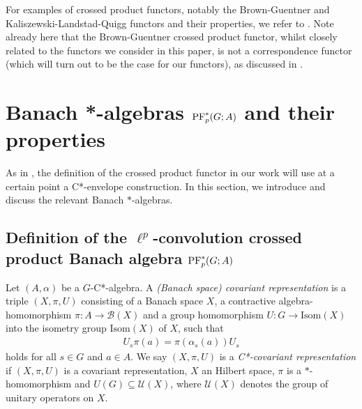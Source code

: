 \documentclass[12pt]{amsart}
\theoremstyle{definition}
\theoremstyle{remark}
\numberwithin{equation}{section}
\begin{document}
For examples of crossed product functors, notably the Brown-Guentner and Kaliszewski-Landstad-Quigg functors and their properties, we refer to \cite{BEW}. Note already here that the Brown-Guentner crossed product functor, whilst closely related to the functors we consider in this paper, is not a correspondence functor (which will turn out to be the case for our functors), as discussed in \cite[Remark 4.19]{BEW}.


\section{Banach *-algebras $\textup{PF}_p^*(G;A)$ and their properties} \label{sec:Banach}

As in \cite{SW2}, the  definition of the crossed product functor in our work will use at a certain point a C*-envelope construction. In this section, we introduce and discuss the relevant Banach $*$-algebras.

\subsection{Definition of the $\ell^p$-convolution crossed product Banach algebra $\textup{PF}_p^*(G;A)$}


Let $(A,\alpha)$ be a $G$-C*-algebra. A \emph{(Banach space) covariant representation} is a triple
$(X,\pi, U)$ consisting of a Banach space $X$, a contractive algebra-homomorphism
$\pi\colon A \to \mathcal{B}(X)$ and a group homomorphism
$U\colon G \to \mbox{Isom}(X)$ into the isometry group $\mbox{Isom}(X)$ of $X$, such that
\begin{align*}
	U_s \pi(a) = \pi(\alpha_s(a)) U_s
\end{align*}
holds for all $s\in G$ and $a\in A$. We say $(X,\pi, U)$ is a \emph{C*-covariant representation}
if $(X,\pi, U)$ is a covariant representation, $X$ an Hilbert space, $\pi$ is a $*$-homomorphism
and $U(G) \subseteq \mathcal{U}(X)$, where $\mathcal{U}(X)$ denotes the group
of unitary operators on $X$.
\end{document}
